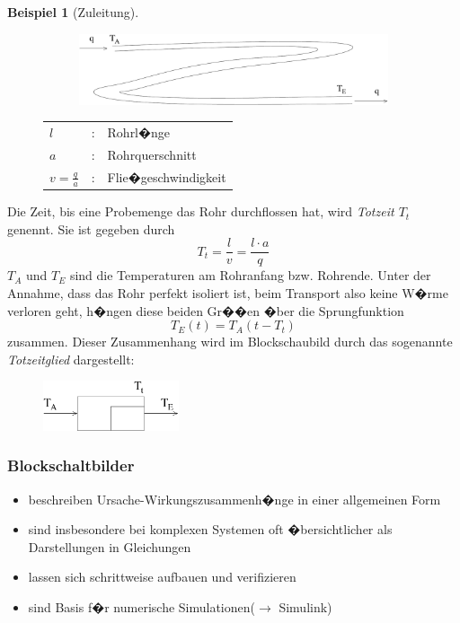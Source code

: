 \documentclass[12pt,a4paper,ngerman]{scrartcl}
\newtheorem{bsp}{Beispiel}[section] %
\begin{document}
\begin{bsp}[Zuleitung]
\end{bsp}
\begin{figure}[H]
\begin{minipage}{.6\linewidth}
\begin{figure}[H]
 \includegraphics[width=.9\linewidth]{sysregel_bsp_5} 
\end{figure}
\end{minipage}
\begin{minipage}{.4\linewidth}
\begin{tabular}{lll}
$l$&:& Rohrl�nge\\
$a$&:&Rohrquerschnitt\\
$v=\frac{q}{a}$&:& Flie�geschwindigkeit
\end{tabular}
\end{minipage}
\end{figure}

Die Zeit, bis eine Probemenge das Rohr durchflossen hat, wird \emph{Totzeit $T_t$} genennt. Sie ist gegeben durch
\begin{equation*}
  T_t=\frac{l}{v}=\frac{l \cdot a}{q}
\end{equation*}
$T_A$ und $T_E$ sind die Temperaturen am Rohranfang bzw. Rohrende. Unter der Annahme, dass das Rohr perfekt isoliert ist, beim Transport also keine W�rme verloren geht, h�ngen diese beiden Gr��en �ber die Sprungfunktion
\begin{equation*}
  T_E(t)=T_A(t-T_t)
\end{equation*}
zusammen. Dieser Zusammenhang wird im Blockschaubild durch das sogenannte \emph{Totzeitglied} dargestellt:
\begin{figure}[H]
  \includegraphics[width=4cm]{sysregel_tglied}
\end{figure}

\subsubsection*{Blockschaltbilder}
\begin{itemize}
\item beschreiben Ursache-Wirkungszusammenh�nge in einer allgemeinen Form
\item sind insbesondere bei komplexen Systemen oft �bersichtlicher als Darstellungen in Gleichungen
\item lassen sich schrittweise aufbauen und verifizieren
\item sind Basis f�r numerische Simulationen($\rightarrow$ Simulink)
\end{itemize}
\end{document}
